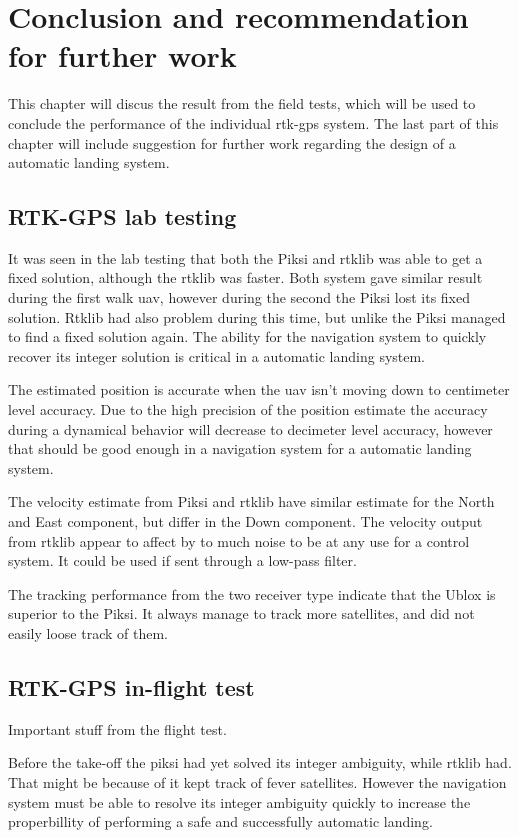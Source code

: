
\chapter{Conclusion and recommendation for further work}
This chapter will discus the result from the field tests, which will be used to conclude the performance of the individual \gls{rtk-gps} system. The last part of this chapter will include suggestion for further work regarding the design of a automatic landing system.
\section{RTK-GPS lab testing}
It was seen in the lab testing that both the Piksi and \gls{rtklib} was able to get a fixed solution, although the \gls{rtklib} was faster. Both system gave similar result during the first walk \gls{uav}, however during the second the Piksi lost its fixed solution. Rtklib had also problem during this time, but unlike the Piksi managed to find a fixed solution again. The ability for the navigation system to quickly recover its integer solution is critical in a automatic landing system.



The estimated position is accurate when the \gls{uav} isn't moving down to centimeter level accuracy. Due to the high precision of the position estimate the accuracy during a dynamical behavior will decrease to decimeter level accuracy, however that should be good enough in a navigation system for a automatic landing system.

The velocity estimate from Piksi and \gls{rtklib} have similar estimate for the North and East component, but differ in the Down component. The velocity output from \gls{rtklib} appear to affect by to much noise to be at any use for a control system. It could be used if sent through a low-pass filter.

The tracking performance from the two receiver type indicate that the Ublox is superior to the Piksi. It always manage to track more satellites, and did not easily loose track of them.
\section{RTK-GPS in-flight test}
Important stuff from the flight test.

Before the take-off the piksi had yet solved its integer ambiguity, while \gls{rtklib} had. That might be because of it kept track of fever satellites. However the navigation system must be able to resolve its integer ambiguity quickly to increase the properbillity of performing a safe and successfully automatic landing.

